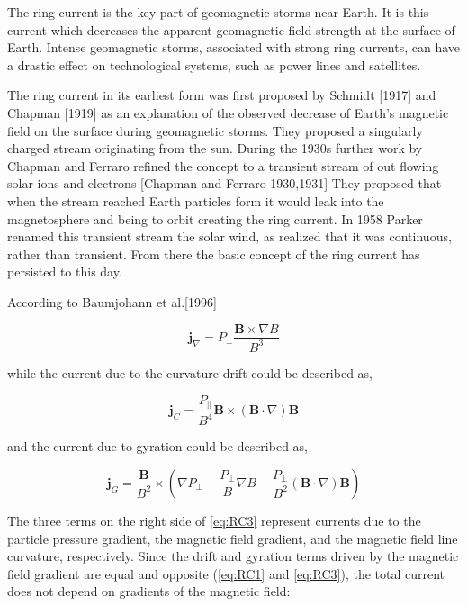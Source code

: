\documentclass[utf8]{report}
\begin{document}
The ring current is the key part of geomagnetic storms near Earth. It is this current which decreases the apparent geomagnetic field strength at the surface of Earth. Intense geomagnetic storms, associated with strong ring currents, can have a drastic effect on technological systems, such as power lines and satellites. 

The ring current in its earliest form was first proposed by Schmidt [1917] and Chapman [1919] as an explanation of the observed decrease of Earth's magnetic field on the surface during geomagnetic storms. They proposed a singularly charged stream originating from the sun. During the 1930s further work by Chapman and Ferraro refined the concept to a transient stream of out flowing solar ions and electrons [Chapman and Ferraro 1930,1931] They proposed that when the stream reached Earth particles form it would leak into the magnetosphere and being to orbit creating the ring current. In 1958 Parker renamed this transient stream the solar wind, as realized that it was continuous, rather than transient. From there the basic concept of the ring current has persisted to this day.  

According to Baumjohann et al.[1996] %

\begin{equation}
    \textbf{j}_{\nabla} = P_{\perp} \frac{\textbf{B} \times \nabla B}{B^{3}}
    \label{eq:RC1}
\end{equation}

while the current due to the curvature drift could be described as, 

\begin{equation}
    \textbf{j}_{C} = \frac{P_{||}}{B^{4}} \textbf{B} \times (\textbf{B} \cdot \nabla)\textbf{B}
    \label{eq:RC2}
\end{equation}

and the current due to gyration could be described as, 

\begin{equation}
    \textbf{j}_{G} = \frac{\textbf{B}}{B^{2}} \times (\nabla P_{\perp} - \frac{P_{\perp}}{B} \nabla B - \frac{P_{\perp}}{B^{2}} (\textbf{B} \cdot \nabla)\textbf{B})
    \label{eq:RC3}
\end{equation}

The three terms on the right side of \ref{eq:RC3} represent currents due to the particle pressure gradient, the magnetic field gradient, and the magnetic field line curvature, respectively. Since the drift and gyration terms driven by the magnetic field gradient are equal and opposite (\ref{eq:RC1} and \ref{eq:RC3}), the total current does not depend on gradients of the magnetic field: 
\end{document}
